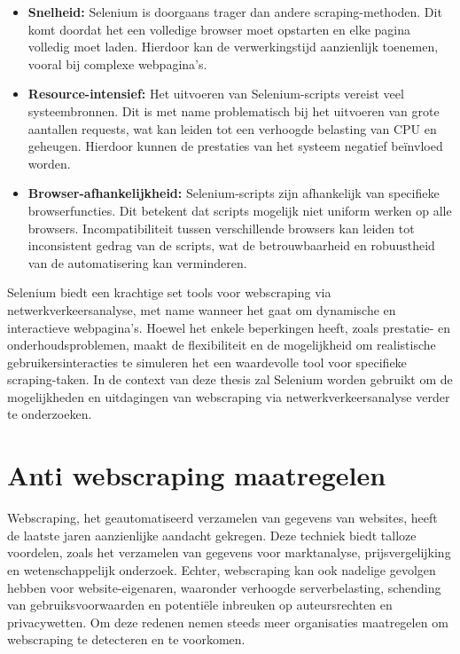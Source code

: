 \begin{itemize}
    \item \textbf{Snelheid:} Selenium is doorgaans trager dan andere scraping-methoden. Dit komt doordat het een volledige browser moet opstarten en elke pagina volledig moet laden. Hierdoor kan de verwerkingstijd aanzienlijk toenemen, vooral bij complexe webpagina's.

    \item \textbf{Resource-intensief:} Het uitvoeren van Selenium-scripts vereist veel systeembronnen. Dit is met name problematisch bij het uitvoeren van grote aantallen requests, wat kan leiden tot een verhoogde belasting van CPU en geheugen. Hierdoor kunnen de prestaties van het systeem negatief beïnvloed worden.

    \item \textbf{Browser-afhankelijkheid:} Selenium-scripts zijn afhankelijk van specifieke browserfuncties. Dit betekent dat scripts mogelijk niet uniform werken op alle browsers. Incompatibiliteit tussen verschillende browsers kan leiden tot inconsistent gedrag van de scripts, wat de betrouwbaarheid en robuustheid van de automatisering kan verminderen.
\end{itemize}

Selenium biedt een krachtige set tools voor webscraping via netwerkverkeersanalyse, met name wanneer het gaat om dynamische en interactieve webpagina's. Hoewel het enkele beperkingen heeft, zoals prestatie- en onderhoudsproblemen, maakt de flexibiliteit en de mogelijkheid om realistische gebruikersinteracties te simuleren het een waardevolle tool voor specifieke scraping-taken. In de context van deze thesis zal Selenium worden gebruikt om de mogelijkheden en uitdagingen van webscraping via netwerkverkeersanalyse verder te onderzoeken.

\section{Anti webscraping maatregelen}
Webscraping, het geautomatiseerd verzamelen van gegevens van websites, heeft de laatste jaren aanzienlijke aandacht gekregen. Deze techniek biedt talloze voordelen, zoals het verzamelen van gegevens voor marktanalyse, prijsvergelijking en wetenschappelijk onderzoek. Echter, webscraping kan ook nadelige gevolgen hebben voor website-eigenaren, waaronder verhoogde serverbelasting, schending van gebruiksvoorwaarden en potentiële inbreuken op auteursrechten en privacywetten. Om deze redenen nemen steeds meer organisaties maatregelen om webscraping te detecteren en te voorkomen.


